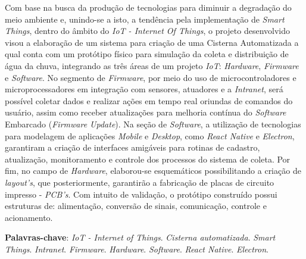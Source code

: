 
\begin{resumo}[RESUMO]
\begin{SingleSpacing}

 Com base na busca da produção de tecnologias para diminuir a degradação do meio ambiente e, unindo-se a isto, a tendência pela implementação de \textit{Smart Things}, dentro do âmbito do \textit{IoT - Internet Of Things},  o projeto desenvolvido visou a elaboração de um sistema para criação de uma Cisterna Automatizada a qual conta com um protótipo físico para simulação da coleta e distribuição de água da chuva, integrando as três áreas de um projeto \textit{IoT}: \textit{Hardware}, \textit{Firmware} e \textit{Software}. No segmento de \textit{Firmware}, por meio do uso de microcontroladores e microprocessadores em integração com sensores, atuadores e a \textit{Intranet}, será possível coletar dados e realizar ações em tempo real oriundas de comandos do usuário, assim como receber atualizações para melhoria contínua do \textit{Software} Embarcado (\textit{Firmware Update}).  Na seção de \textit{Software}, a utilização de tecnologias para modelagem de aplicações \textit{Mobile} e \textit{Desktop}, como  \textit{React Native} e \textit{Electron},  garantiram a criação de interfaces amigáveis para rotinas de cadastro, atualização, monitoramento e controle dos processos do sistema de coleta. Por fim, no campo de \textit{Hardware}, elaborou-se esquemáticos possibilitando a criação de \textit{layout's}, que posteriormente, garantirão a fabricação de placas de circuito impresso - \textit{PCB's}. Com intuito de validação, o protótipo construído possui estruturas de: alimentação, conversão de sinais, comunicação, controle e acionamento.
 
 
\vspace{\onelineskip}

\textbf{Palavras-chave}: \textit{IoT - Internet of Things}. \textit{Cisterna automatizada}. \textit{Smart Things}. \textit{Intranet}.   \textit{Firmware}. \textit{Hardware}. \textit{Software}. \textit{React Native}. \textit{Electron}.

\end{SingleSpacing}
\end{resumo}



